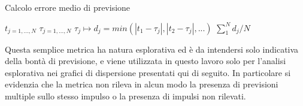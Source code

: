 \begin{algorithm}
\caption{Calcolo errore medio di previsione}\label{alg:errore}
\begin{algorithmic}[1]
\State $t_{j=1,...,N}$ 
\State $\tau_{j=1,...,N}$ 
\State $\tau_{j}\mapsto d_{j} = min( |t_{1}-\tau_{j}|, |t_{2}-\tau_{j}|, ...)$ 
\State $\sum_{1}^{N} d_{j}/N$ 
\end{algorithmic}
\end{algorithm}

Questa semplice metrica ha natura esplorativa ed è da intendersi solo indicativa della bontà di previsione, e viene utilizzata in questo lavoro solo per l'analisi esplorativa nei grafici di dispersione presentati qui di seguito. In particolare si evidenzia che la metrica non rileva in alcun modo la presenza di previsioni multiple sullo stesso impulso o la presenza di impulsi non rilevati.

% 

